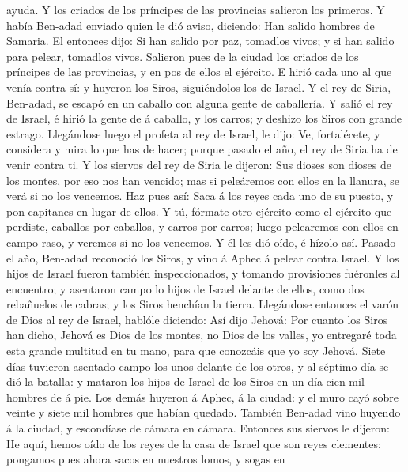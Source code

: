 ayuda.  Y los criados de los príncipes de las provincias
salieron los primeros. Y había Ben-adad enviado quien le dió aviso,
diciendo: Han salido hombres de Samaria.  El entonces
dijo: Si han salido por paz, tomadlos vivos; y si han salido para
pelear, tomadlos vivos.  Salieron pues de la ciudad los
criados de los príncipes de las provincias, y en pos de ellos el
ejército.  E hirió cada uno al que venía contra sí: y
huyeron los Siros, siguiéndolos los de Israel. Y el rey de Siria,
Ben-adad, se escapó en un caballo con alguna gente de caballería.
 Y salió el rey de Israel, é hirió la gente de á caballo,
y los carros; y deshizo los Siros con grande estrago. 
Llegándose luego el profeta al rey de Israel, le dijo: Ve, fortalécete,
y considera y mira lo que has de hacer; porque pasado el año, el rey de
Siria ha de venir contra ti.  Y los siervos del rey de
Siria le dijeron: Sus dioses son dioses de los montes, por eso nos han
vencido; mas si peleáremos con ellos en la llanura, se verá si no los
vencemos.  Haz pues así: Saca á los reyes cada uno de su
puesto, y pon capitanes en lugar de ellos.  Y tú, fórmate
otro ejército como el ejército que perdiste, caballos por caballos, y
carros por carros; luego pelearemos con ellos en campo raso, y veremos
si no los vencemos. Y él les dió oído, é hízolo así. 
Pasado el año, Ben-adad reconoció los Siros, y vino á Aphec á pelear
contra Israel.  Y los hijos de Israel fueron también
inspeccionados, y tomando provisiones fuéronles al encuentro; y
asentaron campo lo hijos de Israel delante de ellos, como dos rebañuelos
de cabras; y los Siros henchían la tierra.  Llegándose
entonces el varón de Dios al rey de Israel, hablóle diciendo: Así dijo
Jehová: Por cuanto los Siros han dicho, Jehová es Dios de los montes, no
Dios de los valles, yo entregaré toda esta grande multitud en tu mano,
para que conozcáis que yo soy Jehová.  Siete días
tuvieron asentado campo los unos delante de los otros, y al séptimo día
se dió la batalla: y mataron los hijos de Israel de los Siros en un día
cien mil hombres de á pie.  Los demás huyeron á Aphec, á
la ciudad: y el muro cayó sobre veinte y siete mil hombres que habían
quedado. También Ben-adad vino huyendo á la ciudad, y escondíase de
cámara en cámara.  Entonces sus siervos le dijeron: He
aquí, hemos oído de los reyes de la casa de Israel que son reyes
clementes: pongamos pues ahora sacos en nuestros lomos, y sogas en
